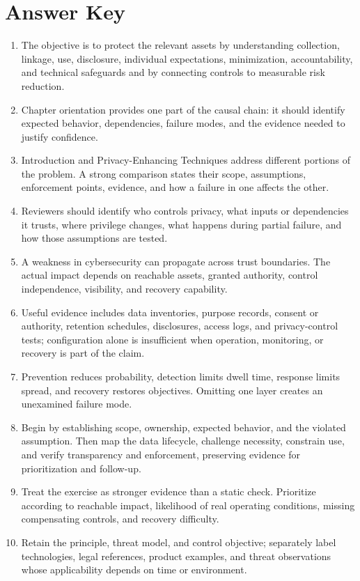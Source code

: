 \documentclass[11pt,letterpaper]{article}
\begin{document}
\section*{Answer Key}
\begin{enumerate}
\item The objective is to protect the relevant assets by understanding collection, linkage, use, disclosure, individual expectations, minimization, accountability, and technical safeguards and by connecting controls to measurable risk reduction.
\item Chapter orientation provides one part of the causal chain: it should identify expected behavior, dependencies, failure modes, and the evidence needed to justify confidence.
\item Introduction and Privacy-Enhancing Techniques address different portions of the problem. A strong comparison states their scope, assumptions, enforcement points, evidence, and how a failure in one affects the other.
\item Reviewers should identify who controls privacy, what inputs or dependencies it trusts, where privilege changes, what happens during partial failure, and how those assumptions are tested.
\item A weakness in cybersecurity can propagate across trust boundaries. The actual impact depends on reachable assets, granted authority, control independence, visibility, and recovery capability.
\item Useful evidence includes data inventories, purpose records, consent or authority, retention schedules, disclosures, access logs, and privacy-control tests; configuration alone is insufficient when operation, monitoring, or recovery is part of the claim.
\item Prevention reduces probability, detection limits dwell time, response limits spread, and recovery restores objectives. Omitting one layer creates an unexamined failure mode.
\item Begin by establishing scope, ownership, expected behavior, and the violated assumption. Then map the data lifecycle, challenge necessity, constrain use, and verify transparency and enforcement, preserving evidence for prioritization and follow-up.
\item Treat the exercise as stronger evidence than a static check. Prioritize according to reachable impact, likelihood of real operating conditions, missing compensating controls, and recovery difficulty.
\item Retain the principle, threat model, and control objective; separately label technologies, legal references, product examples, and threat observations whose applicability depends on time or environment.
\end{enumerate}
\end{document}
